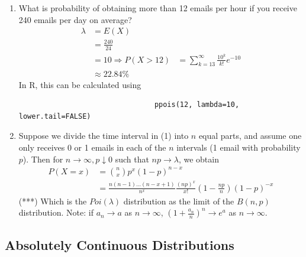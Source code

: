\documentclass{article}
\begin{document}
\begin{itemize}
\begin{myrem*}{}{}
\begin{enumerate}
							\item What is probability of obtaining more than 12 emails per hour if you receive 240 emails per day on average?
							\begin{align*}
								\lambda&=E(X)\\
								&=\frac{240}{24}\\
								&=10
								\Rightarrow P(X>12)&=\sum_{k=13}^{\infty}\frac{10^k}{k!}e^{-10}\\
								&\approx22.84\%
							\end{align*}
							In R, this can be calculated using \begin{verbatim}
								ppois(12, lambda=10, lower.tail=FALSE)
							\end{verbatim}
							
							\item Suppose we divide the time interval in (1) into $n$ equal parts, and assume one only receives 0 or 1 emails in each of the $n$ intervals (1 email with probability $p$). Then for $n\to\infty, p\downarrow0$ such that $np\to\lambda$, we obtain
							\begin{align*}
								P(X=x)&=\binom{n}{x}p^x(1-p)^{n-x}\\
								&=\frac{n(n-1)\dots(n-x+1)}{n^x}\frac{(np)^x}{x!}(1-\frac{np}{n})(1-p)^{-x}
							\end{align*}
							(***) Which is the $Poi(\lambda)$ distribution as the limit of the $B(n, p)$ distribution. Note: if $a_n\to a$ as $n\to\infty$, $(1+\frac{a_n}{n})^n\to e^a$ as $n\to\infty$.
						\end{enumerate}
					\end{myrem*}
				\end{itemize}
		
		\subsection{Absolutely Continuous Distributions}
\end{document}

